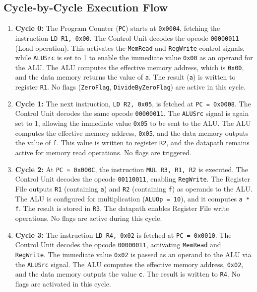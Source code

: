 \documentclass[12pt]{article}
\begin{document}
\subsection*{Cycle-by-Cycle Execution Flow}

\begin{enumerate}
    \item \textbf{Cycle 0:} The Program Counter (\texttt{PC}) starts at \texttt{0x0004}, fetching the instruction \texttt{LD R1, 0x00}. The Control Unit decodes the opcode \texttt{00000011} (Load operation). This activates the \texttt{MemRead} and \texttt{RegWrite} control signals, while \texttt{ALUSrc} is set to 1 to enable the immediate value \texttt{0x00} as an operand for the ALU. The ALU computes the effective memory address, which is \texttt{0x00}, and the data memory returns the value of \texttt{a}. The result (\texttt{a}) is written to register \texttt{R1}. No flags (\texttt{ZeroFlag}, \texttt{DivideByZeroFlag}) are active in this cycle.

    \item \textbf{Cycle 1:} The next instruction, \texttt{LD R2, 0x05}, is fetched at \texttt{PC = 0x0008}. The Control Unit decodes the same opcode \texttt{00000011}. The \texttt{ALUSrc} signal is again set to 1, allowing the immediate value \texttt{0x05} to be sent to the ALU. The ALU computes the effective memory address, \texttt{0x05}, and the data memory outputs the value of \texttt{f}. This value is written to register \texttt{R2}, and the datapath remains active for memory read operations. No flags are triggered.

    \item \textbf{Cycle 2:} At \texttt{PC = 0x000C}, the instruction \texttt{MUL R3, R1, R2} is executed. The Control Unit decodes the opcode \texttt{00110011}, enabling \texttt{RegWrite}. The Register File outputs \texttt{R1} (containing \texttt{a}) and \texttt{R2} (containing \texttt{f}) as operands to the ALU. The ALU is configured for multiplication (\texttt{ALUOp = 10}), and it computes \texttt{a * f}. The result is stored in \texttt{R3}. The datapath enables Register File write operations. No flags are active during this cycle.

    \item \textbf{Cycle 3:} The instruction \texttt{LD R4, 0x02} is fetched at \texttt{PC = 0x0010}. The Control Unit decodes the opcode \texttt{00000011}, activating \texttt{MemRead} and \texttt{RegWrite}. The immediate value \texttt{0x02} is passed as an operand to the ALU via the \texttt{ALUSrc} signal. The ALU computes the effective memory address, \texttt{0x02}, and the data memory outputs the value \texttt{c}. The result is written to \texttt{R4}. No flags are activated in this cycle.


\end{enumerate}
\end{document}
